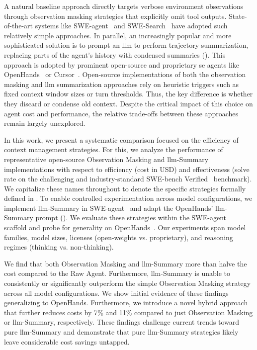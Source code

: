 \documentclass{article}
\begin{document}
A natural baseline approach directly targets verbose environment observations through observation masking strategies that explicitly omit tool outputs. State-of-the-art systems like SWE-agent~\cite{yang_swe-agent_2024} and SWE-Search~\cite{antoniades2025swesearch} have adopted such relatively simple approaches. In parallel, an increasingly popular and more sophisticated solution is to prompt an \ac{llm} to perform trajectory summarization, replacing parts of the agent's history with condensed summaries (). This approach is adopted by prominent open-source and proprietary \ac{se} agents like OpenHands~\cite{wang2025openhands} or Cursor~\cite{cursor_summarization}. Open-source implementations of both the observation masking and \ac{llm} summarization approaches rely on heuristic triggers such as fixed context window sizes or turn thresholds. Thus, the key difference is whether they discard or condense old context. Despite the critical impact of this choice on agent cost and performance, the relative trade-offs between these approaches remain largely unexplored. 

In this work, we present a systematic comparison focused on the efficiency of context management strategies. For this, we analyze the performance of representative open-source Observation Masking and \ac{llm}-Summary implementations with respect to efficiency (cost in USD) and effectiveness (solve rate on the challenging and industry-standard SWE-bench Verified~\cite{openai_swe_bench_verified_2024} benchmark). We capitalize these names throughout to denote the specific strategies formally defined in . To enable controlled experimentation across model configurations, we implement \ac{llm}-Summary in SWE-agent~\cite{yang_swe-agent_2024} and adapt the OpenHands' \ac{llm}-Summary prompt (). We evaluate these strategies within the SWE-agent~\cite{yang_swe-agent_2024} scaffold and probe for generality on OpenHands~\cite{wang2025openhands}. Our experiments span model families, model sizes, licenses (open-weights vs. proprietary), and reasoning regimes (thinking vs. non-thinking). 

We find that both Observation Masking and \ac{llm}-Summary more than halve the cost compared to the Raw Agent. Furthermore, \ac{llm}-Summary is unable to consistently or significantly outperform the simple Observation Masking strategy across all model configurations. We show initial evidence of these findings generalizing to OpenHands. Furthermore, we introduce a novel hybrid approach that further reduces costs by 7\% and 11\% compared to just Observation Masking or \ac{llm}-Summary, respectively. These findings challenge current trends toward pure \ac{llm}-Summary and demonstrate that pure \ac{llm}-Summary strategies likely leave considerable cost savings untapped. 
\end{document}
